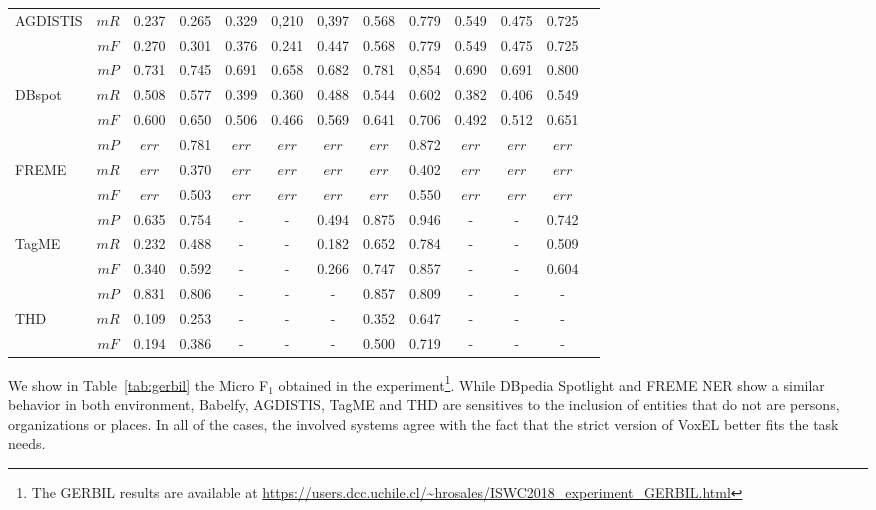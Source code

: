 \documentclass{llncs}
\begin{document}
\begin{table}[tb!]
{\begin{tabular}{@{}lcccccccccccc@{}}
AGDISTIS    &$mR$& 0.237& 0.265 & 0.329 & 0,210 & 0,397 & 0.568 & 0.779 & 0.549 & 0.475 & 0.725 \\
            &$mF$& 0.270& 0.301 & 0.376 & 0.241 & 0.447 & 0.568 & 0.779 & 0.549 & 0.475 & 0.725 \\\midrule
            &$mP$& 0.731& 0.745 & 0.691 & 0.658 & 0.682 & 0.781 & 0,854 & 0.690 & 0.691 & 0.800  \\
DBspot      &$mR$& 0.508& 0.577 & 0.399 & 0.360 & 0.488 & 0.544 & 0.602 & 0.382 & 0.406 & 0.549  \\
            &$mF$& 0.600& 0.650 & 0.506 & 0.466 & 0.569 & 0.641 & 0.706 & 0.492 & 0.512 & 0.651 \\\midrule
            &$mP$& $err$& 0.781 & $err$ & $err$ & $err$ & $err$ & 0.872 & $err$ & $err$ & $err$  \\
FREME       &$mR$& $err$& 0.370 & $err$ & $err$ & $err$ & $err$ & 0.402 & $err$ & $err$ & $err$  \\
            &$mF$& $err$& 0.503 & $err$ & $err$ & $err$ & $err$ & 0.550 & $err$ & $err$ & $err$ \\\midrule
            &$mP$& 0.635& 0.754 & -     & -     & 0.494 & 0.875 & 0.946 & -     & -     & 0.742  \\
TagME       &$mR$& 0.232& 0.488 & -     & -     & 0.182 & 0.652 & 0.784 & -     & -     & 0.509  \\
            &$mF$& 0.340& 0.592 & -     & -     & 0.266 & 0.747 & 0.857 & -     & -     & 0.604 \\\midrule
            &$mP$& 0.831& 0.806 & -     & -     & -     & 0.857 & 0.809 & -     & -     & -     \\
THD         &$mR$& 0.109& 0.253 & -     & -     & -     & 0.352 & 0.647 & -     & -     & -     \\
            &$mF$& 0.194& 0.386 & -     & -     & -     & 0.500 & 0.719 & -     & -     & -    \\\bottomrule 
\end{tabular}
}
\end{table}

We show in Table~\ref{tab:gerbil} the Micro F$_1$ obtained in the experiment\footnote{The GERBIL results are available at \url{https://users.dcc.uchile.cl/~hrosales/ISWC2018_experiment_GERBIL.html}}. While DBpedia Spotlight and FREME NER show a similar behavior in both environment, Babelfy, AGDISTIS, TagME and THD are sensitives to the inclusion of entities that do not are persons, organizations or places. In all of the cases, the involved systems agree with the fact that the strict version of VoxEL better fits the task needs. 
\end{document}
